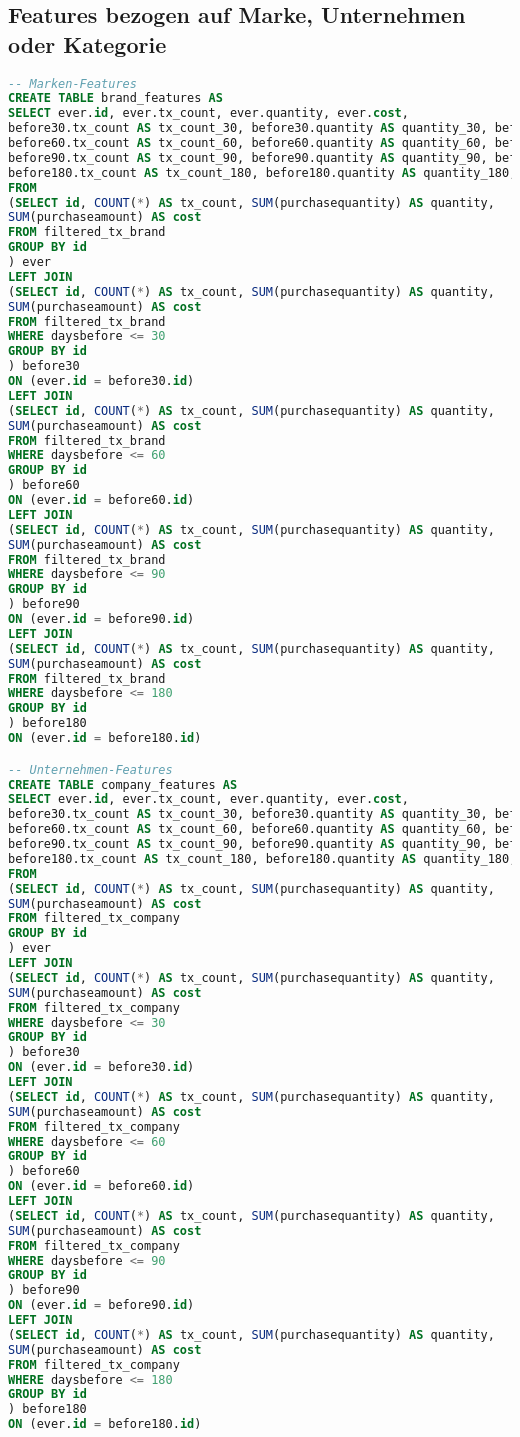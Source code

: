 \subsection{Features bezogen auf Marke, Unternehmen oder Kategorie}
\label{sql:features_bcc}
\begin{lstlisting}[language=SQL]
-- Marken-Features
CREATE TABLE brand_features AS
SELECT ever.id, ever.tx_count, ever.quantity, ever.cost,
before30.tx_count AS tx_count_30, before30.quantity AS quantity_30, before30.cost AS cost_30,
before60.tx_count AS tx_count_60, before60.quantity AS quantity_60, before60.cost AS cost_60,
before90.tx_count AS tx_count_90, before90.quantity AS quantity_90, before90.cost AS cost_90,
before180.tx_count AS tx_count_180, before180.quantity AS quantity_180, before180.cost AS cost_180
FROM 
(SELECT id, COUNT(*) AS tx_count, SUM(purchasequantity) AS quantity, 
SUM(purchaseamount) AS cost
FROM filtered_tx_brand
GROUP BY id
) ever
LEFT JOIN
(SELECT id, COUNT(*) AS tx_count, SUM(purchasequantity) AS quantity, 
SUM(purchaseamount) AS cost
FROM filtered_tx_brand
WHERE daysbefore <= 30
GROUP BY id
) before30
ON (ever.id = before30.id)
LEFT JOIN
(SELECT id, COUNT(*) AS tx_count, SUM(purchasequantity) AS quantity, 
SUM(purchaseamount) AS cost
FROM filtered_tx_brand
WHERE daysbefore <= 60
GROUP BY id
) before60
ON (ever.id = before60.id)
LEFT JOIN
(SELECT id, COUNT(*) AS tx_count, SUM(purchasequantity) AS quantity, 
SUM(purchaseamount) AS cost
FROM filtered_tx_brand
WHERE daysbefore <= 90
GROUP BY id
) before90
ON (ever.id = before90.id)
LEFT JOIN 
(SELECT id, COUNT(*) AS tx_count, SUM(purchasequantity) AS quantity, 
SUM(purchaseamount) AS cost
FROM filtered_tx_brand
WHERE daysbefore <= 180
GROUP BY id
) before180
ON (ever.id = before180.id)

-- Unternehmen-Features
CREATE TABLE company_features AS
SELECT ever.id, ever.tx_count, ever.quantity, ever.cost,
before30.tx_count AS tx_count_30, before30.quantity AS quantity_30, before30.cost AS cost_30,
before60.tx_count AS tx_count_60, before60.quantity AS quantity_60, before60.cost AS cost_60,
before90.tx_count AS tx_count_90, before90.quantity AS quantity_90, before90.cost AS cost_90,
before180.tx_count AS tx_count_180, before180.quantity AS quantity_180, before180.cost AS cost_180
FROM 
(SELECT id, COUNT(*) AS tx_count, SUM(purchasequantity) AS quantity, 
SUM(purchaseamount) AS cost
FROM filtered_tx_company
GROUP BY id
) ever
LEFT JOIN
(SELECT id, COUNT(*) AS tx_count, SUM(purchasequantity) AS quantity, 
SUM(purchaseamount) AS cost
FROM filtered_tx_company
WHERE daysbefore <= 30
GROUP BY id
) before30
ON (ever.id = before30.id)
LEFT JOIN
(SELECT id, COUNT(*) AS tx_count, SUM(purchasequantity) AS quantity, 
SUM(purchaseamount) AS cost
FROM filtered_tx_company
WHERE daysbefore <= 60
GROUP BY id
) before60
ON (ever.id = before60.id)
LEFT JOIN
(SELECT id, COUNT(*) AS tx_count, SUM(purchasequantity) AS quantity, 
SUM(purchaseamount) AS cost
FROM filtered_tx_company
WHERE daysbefore <= 90
GROUP BY id
) before90
ON (ever.id = before90.id)
LEFT JOIN 
(SELECT id, COUNT(*) AS tx_count, SUM(purchasequantity) AS quantity, 
SUM(purchaseamount) AS cost
FROM filtered_tx_company
WHERE daysbefore <= 180
GROUP BY id
) before180
ON (ever.id = before180.id)


\end{lstlisting}
